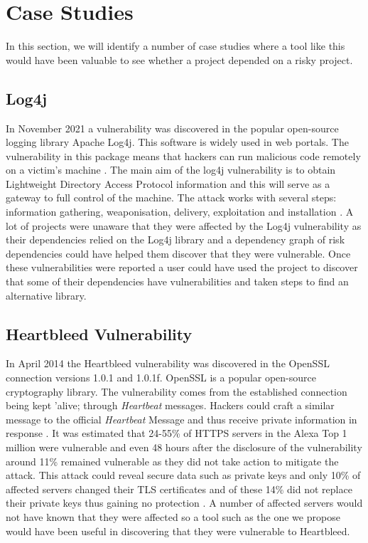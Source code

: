 \documentclass[conference]{IEEEtran}
\begin{document}
{\section{Case Studies}
In this section, we will identify a number of case studies where a tool like this would have been valuable to see whether a project depended on a risky project. 

\subsection{Log4j}
In November 2021 a vulnerability was discovered in the popular open-source logging library Apache Log4j. This software is widely used in web portals. The vulnerability in this package means that hackers can run malicious code remotely on a victim's machine \cite{h_gupta_identification_2022}. The main aim of the log4j vulnerability is to obtain Lightweight Directory Access Protocol information and this will serve as a gateway to full control of the machine. The attack works with several steps: information gathering, weaponisation, delivery, exploitation and installation \cite{f_maulana_unmasking_2023}. A lot of projects were unaware that they were affected by the Log4j vulnerability as their dependencies relied on the Log4j library and a dependency graph of risk dependencies could have helped them discover that they were vulnerable. Once these vulnerabilities were reported a user could have used the project to discover that some of their dependencies have vulnerabilities and taken steps to find an alternative library. 

\subsection{Heartbleed Vulnerability}
In April 2014 the Heartbleed vulnerability was discovered in the OpenSSL connection versions 1.0.1 and 1.0.1f. OpenSSL is a popular open-source cryptography library. The vulnerability comes from the established connection being kept 'alive; through \textit{Heartbeat} messages. Hackers could craft a similar message to the official \textit{Heartbeat} Message and thus receive private information in response \cite{s_kyatam_heartbleed_2017}. It was estimated that 24-55\% of HTTPS servers in the Alexa Top 1 million were vulnerable and even 48 hours after the disclosure of the vulnerability around 11\% remained vulnerable as they did not take action to mitigate the attack. This attack could reveal secure data such as private keys and only 10\% of affected servers changed their TLS certificates and of these 14\% did not replace their private keys thus gaining no protection \cite{durumeric_matter_2014}. A number of affected servers would not have known that they were affected so a tool such as the one we propose would have been useful in discovering that they were vulnerable to Heartbleed. 

}
\end{document}
